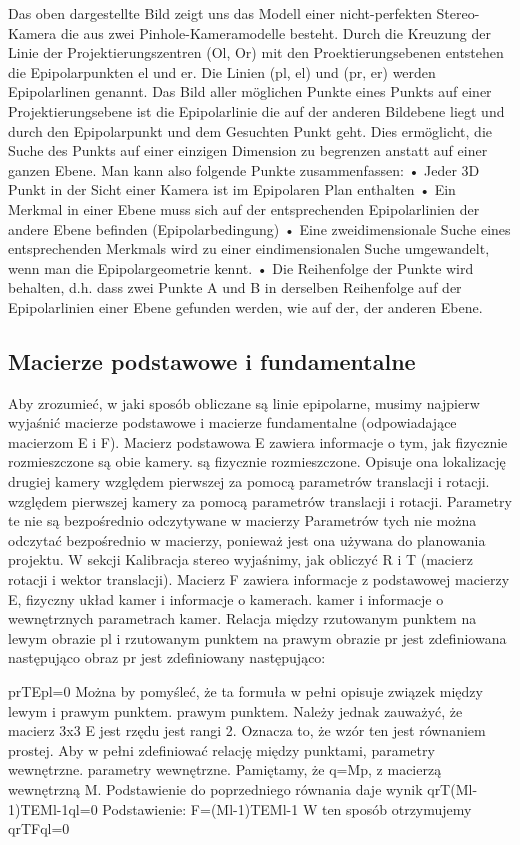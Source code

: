 \documentclass[magisterska]{pracadypl}
\begin{document}
Das oben dargestellte Bild zeigt uns das Modell einer nicht-perfekten Stereo-Kamera die aus
zwei Pinhole-Kameramodelle besteht. Durch die Kreuzung der Linie der Projektierungszentren
(Ol, Or) mit den Proektierungsebenen entstehen die Epipolarpunkten el und er. Die Linien (pl,
el) und (pr, er) werden Epipolarlinen genannt. Das Bild aller möglichen Punkte eines Punkts
auf einer Projektierungsebene ist die Epipolarlinie die auf der anderen Bildebene liegt und
durch den Epipolarpunkt und dem Gesuchten Punkt geht. Dies ermöglicht, die Suche des
Punkts auf einer einzigen Dimension zu begrenzen anstatt auf einer ganzen Ebene.
Man kann also folgende Punkte zusammenfassen:
• Jeder 3D Punkt in der Sicht einer Kamera ist im Epipolaren Plan enthalten
• Ein Merkmal in einer Ebene muss sich auf der entsprechenden Epipolarlinien der
andere Ebene befinden (Epipolarbedingung)
• Eine zweidimensionale Suche eines entsprechenden Merkmals wird zu einer
eindimensionalen Suche umgewandelt, wenn man die Epipolargeometrie kennt.
• Die Reihenfolge der Punkte wird behalten, d.h. dass zwei Punkte A und B in derselben
Reihenfolge auf der Epipolarlinien einer Ebene gefunden werden, wie auf der, der
anderen Ebene.

\subsection{Macierze podstawowe i fundamentalne}

Aby zrozumieć, w jaki sposób obliczane są linie epipolarne, musimy najpierw wyjaśnić macierze podstawowe
i macierze fundamentalne (odpowiadające macierzom E i F).
Macierz podstawowa E zawiera informacje o tym, jak fizycznie rozmieszczone są obie kamery.
są fizycznie rozmieszczone. Opisuje ona lokalizację drugiej kamery względem pierwszej za pomocą parametrów translacji i rotacji.
względem pierwszej kamery za pomocą parametrów translacji i rotacji. Parametry te nie są bezpośrednio odczytywane w macierzy
Parametrów tych nie można odczytać bezpośrednio w macierzy, ponieważ jest ona używana do planowania projektu. W sekcji Kalibracja stereo
wyjaśnimy, jak obliczyć R i T (macierz rotacji i wektor translacji).
Macierz F zawiera informacje z podstawowej macierzy E, fizyczny układ kamer i informacje o kamerach.
kamer i informacje o wewnętrznych parametrach kamer.
Relacja między rzutowanym punktem na lewym obrazie pl i rzutowanym punktem na prawym obrazie pr jest zdefiniowana następująco
obraz pr jest zdefiniowany następująco:

prTEpl=0
Można by pomyśleć, że ta formuła w pełni opisuje związek między lewym i prawym punktem.
prawym punktem. Należy jednak zauważyć, że macierz 3x3 E jest rzędu
jest rangi 2. Oznacza to, że wzór ten jest równaniem prostej.
Aby w pełni zdefiniować relację między punktami, parametry wewnętrzne.
parametry wewnętrzne.
Pamiętamy, że q=Mp, z macierzą wewnętrzną M.
Podstawienie do poprzedniego równania daje wynik
qrT(Ml-1)TEMl-1ql=0
Podstawienie:
F=(Ml-1)TEMl-1
W ten sposób otrzymujemy
qrTFql=0
\end{document}
